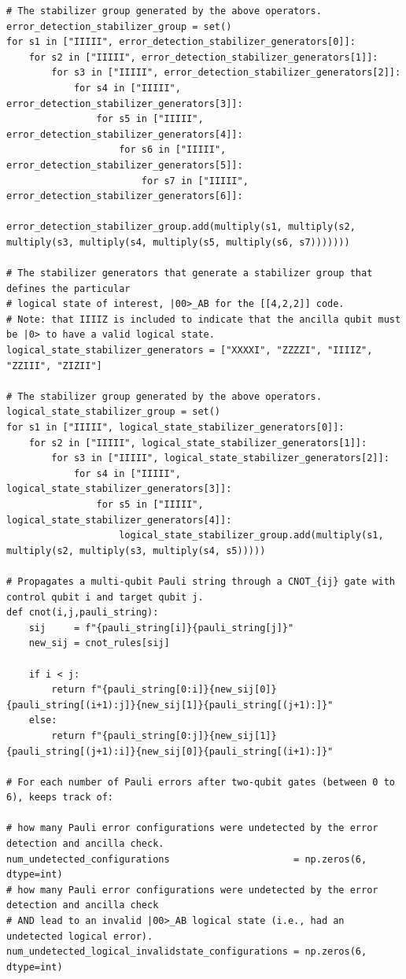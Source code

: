 \documentclass[10pt]{article}
\begin{document}
\begin{lstlisting}
# The stabilizer group generated by the above operators.
error_detection_stabilizer_group = set()
for s1 in ["IIIII", error_detection_stabilizer_generators[0]]:
    for s2 in ["IIIII", error_detection_stabilizer_generators[1]]:
        for s3 in ["IIIII", error_detection_stabilizer_generators[2]]:
            for s4 in ["IIIII", error_detection_stabilizer_generators[3]]:
                for s5 in ["IIIII", error_detection_stabilizer_generators[4]]:
                    for s6 in ["IIIII", error_detection_stabilizer_generators[5]]:
                        for s7 in ["IIIII", error_detection_stabilizer_generators[6]]:
                            error_detection_stabilizer_group.add(multiply(s1, multiply(s2, multiply(s3, multiply(s4, multiply(s5, multiply(s6, s7)))))))

# The stabilizer generators that generate a stabilizer group that defines the particular
# logical state of interest, |00>_AB for the [[4,2,2]] code.
# Note: that IIIIZ is included to indicate that the ancilla qubit must be |0> to have a valid logical state.
logical_state_stabilizer_generators = ["XXXXI", "ZZZZI", "IIIIZ", "ZZIII", "ZIZII"]

# The stabilizer group generated by the above operators.
logical_state_stabilizer_group = set()
for s1 in ["IIIII", logical_state_stabilizer_generators[0]]:
    for s2 in ["IIIII", logical_state_stabilizer_generators[1]]:
        for s3 in ["IIIII", logical_state_stabilizer_generators[2]]:
            for s4 in ["IIIII", logical_state_stabilizer_generators[3]]:
                for s5 in ["IIIII", logical_state_stabilizer_generators[4]]:
                    logical_state_stabilizer_group.add(multiply(s1, multiply(s2, multiply(s3, multiply(s4, s5)))))

# Propagates a multi-qubit Pauli string through a CNOT_{ij} gate with control qubit i and target qubit j.
def cnot(i,j,pauli_string):
    sij     = f"{pauli_string[i]}{pauli_string[j]}"
    new_sij = cnot_rules[sij]

    if i < j:
        return f"{pauli_string[0:i]}{new_sij[0]}{pauli_string[(i+1):j]}{new_sij[1]}{pauli_string[(j+1):]}"
    else:
        return f"{pauli_string[0:j]}{new_sij[1]}{pauli_string[(j+1):i]}{new_sij[0]}{pauli_string[(i+1):]}"

# For each number of Pauli errors after two-qubit gates (between 0 to 6), keeps track of:

# how many Pauli error configurations were undetected by the error detection and ancilla check.
num_undetected_configurations                      = np.zeros(6, dtype=int)
# how many Pauli error configurations were undetected by the error detection and ancilla check
# AND lead to an invalid |00>_AB logical state (i.e., had an undetected logical error).
num_undetected_logical_invalidstate_configurations = np.zeros(6, dtype=int)


\end{lstlisting}
\end{document}
